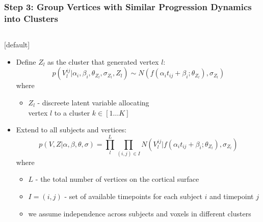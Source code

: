 \begin{frame}
\begin{columns}[T]
\begin{column}{.3\textwidth}
    \end{column}
  \end{columns}
  
  \vspace{6em}
  
% 
%   


\end{frame}



\begin{frame}
\frametitle{Step 3: Group Vertices with Similar Progression Dynamics into Clusters}

\begin{columns}[T]
    \begin{column}{.7\textwidth} %
   
    [default]
     
   \begin{itemize}      
      
      \item Define $Z_l$ as the cluster that generated vertex $l$:
      $$ p(V_l^{ij} | \alpha_i, \beta_i, \theta_{Z_l}, \sigma_{Z_l}, Z_l) \sim N(f(\alpha_i t_{ij} + \beta_i ; \theta_{Z_l}), \sigma_{Z_l}) $$
        where
	\begin{itemize}
	\item $Z_l$ - discreete latent variable allocating\\ vertex $l$ to a cluster $k \in [1 \dots K]$
	\end{itemize}
      \vspace{1em}
      \item Extend to all subjects and vertices:
  $$  p(V, Z | \alpha, \beta, \theta, \sigma) = \prod_l^L \prod_{(i,j) \in I} N(V_l^{ij} | f(\alpha_i t_{ij} + \beta_i ; \theta_{Z_l}), \sigma_{Z_l}) $$
  where
  \begin{itemize}
  \item $L$ - the total number of vertices on the cortical surface
  \item $I = {(i,j)}$ - set of available timepoints for each subject $i$ and timepoint $j$   
  \item we assume independence across subjects and voxels in different clusters
  \end{itemize}
     

\end{itemize}
\end{column}
\end{columns}
\end{frame}

